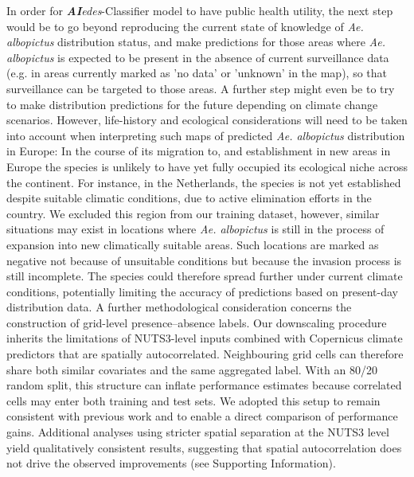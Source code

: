 \documentclass[preprint,12pt]{elsarticle}
\begin{document}
In order for \textit{\textbf{AI}edes}-Classifier model to have public health utility, the next step would be to go beyond reproducing the current state of knowledge of \emph{Ae. albopictus} distribution status, and make predictions for those  areas where \emph{Ae. albopictus} is expected to be present in the absence of current surveillance data (e.g. in areas currently marked as 'no data' or 'unknown' in the map), so that surveillance can be targeted to those areas. A further step might even be to try to make distribution predictions for the future depending on climate change scenarios. However, life-history and ecological considerations will need to be taken into account when interpreting such maps of predicted \textit{Ae. albopictus} distribution in Europe: In the course of its migration to, and establishment in new areas in Europe the species is unlikely to have yet fully occupied its ecological niche across the continent. For instance, in the Netherlands, the species is not yet established despite suitable climatic conditions, due to active elimination efforts in the country. We excluded this region from our training dataset, however, similar situations may exist in locations where \textit{Ae. albopictus} is still in the process of expansion into new climatically suitable areas. Such locations are marked as negative not because of unsuitable conditions but because the invasion process is still incomplete. The species could therefore spread further under current climate conditions, potentially limiting the accuracy of predictions based on present-day distribution data.
A further methodological consideration concerns the construction of grid-level presence--absence labels. Our downscaling procedure inherits the limitations of NUTS3-level inputs combined with Copernicus climate predictors that are spatially autocorrelated. Neighbouring grid cells can therefore share both similar covariates and the same aggregated label. With an 80/20 random split, this structure can inflate performance estimates because correlated cells may enter both training and test sets. We adopted this setup to remain consistent with previous work and to enable a direct comparison of performance gains. Additional analyses using stricter spatial separation at the NUTS3 level yield qualitatively consistent results, suggesting that spatial autocorrelation does not drive the observed improvements (see Supporting Information).
\end{document}
